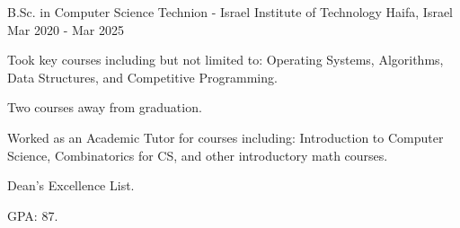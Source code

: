 

\begin{cventries}

  \cventry
    {B.Sc. in Computer Science} %
    {Technion - Israel Institute of Technology} %
    {Haifa, Israel} %
    {Mar 2020 - Mar 2025} %
    {
      \begin{cvitems} %
        \item {Took key courses including but not limited to: Operating Systems, Algorithms, Data Structures, and Competitive Programming.}
        \item {Two courses away from graduation.}
        \item {Worked as an Academic Tutor for courses including: Introduction to Computer Science, Combinatorics for CS, and other introductory math courses.}
        \item {Dean's Excellence List.}
        \item {GPA: 87.}
      \end{cvitems}
    }

\end{cventries}